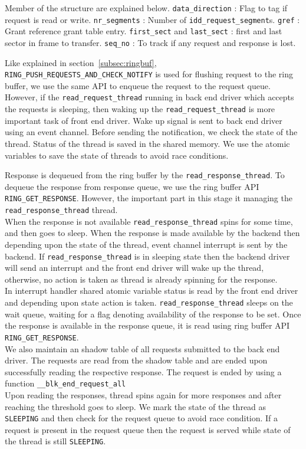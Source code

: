 Member of the structure are explained below.
\texttt{data\_direction} : Flag to tag if request is read or write.
\texttt{nr\_segments} : Number of \texttt{idd\_request\_segment}s.
\texttt{gref} : Grant reference\/ grant table entry.
\texttt{first\_sect} and \texttt{last\_sect} : first and last sector in frame to transfer.
\texttt{seq\_no} : To track if any request and response is lost.


Like explained in section~\ref{subsec:ringbuf}, \texttt{RING\_PUSH\_REQUESTS\_AND\_CHECK\_NOTIFY} is used for flushing request to the ring buffer, we use the same API to enqueue the request to the request queue. However, if the \texttt{read\_request\_thread} running in back end driver which accepts the requests is sleeping, then waking up the \texttt{read\_request\_thread} is more important task of front end driver. Wake up signal is sent to back end driver using an event channel. Before sending the notification, we check the state of the thread. Status of the thread is saved in the shared memory. We use the atomic variables to save the state of threads to avoid race conditions. 

Response is dequeued from the ring buffer by the \texttt{read\_response\_thread}. To dequeue the response from response queue, we use the ring buffer API \texttt{RING\_GET\_RESPONSE}. However, the important part in this stage it managing the \texttt{read\_response\_thread} thread. 
\\
When the response is not available \texttt{read\_response\_thread} spins for some time, and then goes to sleep. When the response is made available by the backend then depending upon the state of the thread, event channel interrupt is sent by the backend. If \texttt{read\_response\_thread} is in sleeping state then the backend driver will send an interrupt and the front end driver will wake up the thread, otherwise, no action is taken as thread is already spinning for the response.
\\
In interrupt handler shared atomic variable status is read by the front end driver and depending upon state action is taken. \texttt{read\_response\_thread} sleeps on the wait queue, waiting for a flag denoting availability of the response to be set. Once the response is available in the response queue, it is read using  ring buffer API \texttt{RING\_GET\_RESPONSE}.
\\
We also maintain an shadow table of all requests submitted to the back end driver. The requests are read from the shadow table and are ended upon successfully reading the respective response. The request is ended by using a function \texttt{\_\_blk\_end\_request\_all}
\\
Upon reading the responses, thread spins again for more responses and after reaching the threshold goes to sleep. We mark the state of the thread as \texttt{SLEEPING} and then check for the request queue to avoid race condition. If a request is present in the request queue then the request is served while state of the thread is still \texttt{SLEEPING}.

